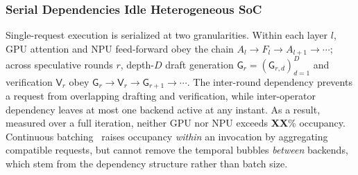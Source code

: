 \documentclass[sigconf,nonacm,10pt]{acmart}
\begin{document}
\subsubsection{Serial Dependencies Idle Heterogeneous SoC} \label{sec:motivation_utilization}
Single-request execution is serialized at two granularities. Within each layer $l$, GPU attention and NPU feed-forward obey the chain $A_l \!\rightarrow\! F_l \!\rightarrow\! A_{l+1} \!\rightarrow\! \cdots$; across speculative rounds $r$, depth-$D$ draft generation $\mathsf G_r\!=\!(\mathsf G_{r,d})_{d=1}^{D}$ and verification $\mathsf V_r$ obey
$\mathsf G_{r}\!\rightarrow\!\mathsf V_r\!\rightarrow\!\mathsf G_{r+1}\!\rightarrow\!\cdots$.
The inter-round dependency prevents a request from overlapping drafting and verification, while inter-operator dependency leaves at most one backend active at any instant. As a result, measured over a full iteration, neither GPU nor NPU exceeds {\color{red}\textbf{XX}\%} occupancy.
Continuous batching~\cite{Orca2022Gyeong,Efficient2023Woosuk} raises occupancy \emph{within} an invocation by aggregating compatible requests, but cannot remove the temporal bubbles \emph{between} backends, which stem from the dependency structure rather than batch size.
\end{document}

